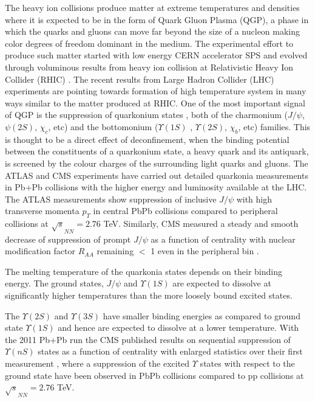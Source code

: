 \documentclass[aps,prc,preprint,superscriptaddress,showpacs,showkeys]{revtex4-1}
\begin{document}
   The heavy ion collisions produce matter at extreme temperatures and densities where 
it is expected to be in the form of Quark Gluon Plasma 
(QGP), a phase in which the quarks and gluons can move far beyond  the size of a nucleon 
making color degrees of freedom dominant in the medium. 
  The experimental effort to produce such matter started with low energy CERN accelerator 
SPS and evolved through voluminous results 
from heavy ion collision at Relativistic Heavy Ion Collider (RHIC) \cite{INTRO}.
The recent results from Large Hadron Collider (LHC) experiments \cite{QGP_Tc} are 
pointing towards formation of high temperature system in many ways similar to the matter
produced at RHIC. 
  One of the most important signal of QGP is the suppression of 
quarkonium states \cite{SATZ}, both of the charmonium ($J/\psi$, $\psi(2S)$, $\chi_{c}$, etc) 
and the bottomonium ($\Upsilon(1S)$ , $\Upsilon(2S)$, $\chi_{b}$, etc) families. This is thought to be a 
direct effect of deconfinement, when the binding potential between the constituents of a quarkonium state, 
a heavy quark and its antiquark, is screened by the colour charges of the surrounding light quarks and gluons. 
 The ATLAS and CMS experiments have carried out detailed quarkonia measurements in Pb+Pb collisions 
with the higher energy and luminosity available at the LHC.
 The ATLAS measurements \cite{ATLAS} show suppression of inclusive $J/\psi$ with high transverse momenta $p_T$  
in central PbPb collisions compared to peripheral collisions at $\sqrt s_{NN} = 2.76$ TeV. 
  Similarly, CMS measured a steady and smooth decrease of suppression 
of prompt $J/\psi$ as a function of centrality with nuclear modification factor $R_{AA}$ remaining $<$ 1 even 
in the peripheral bin \cite{JCMS}. 
 
 The melting temperature of the quarkonia states depends on their binding energy. The ground states, 
$J/\psi$ and $\Upsilon(1S)$ are expected to dissolve at significantly higher temperatures than the 
more loosely bound excited states. 
 
  The $\Upsilon(2S)$ and $\Upsilon(3S)$ have smaller binding energies as compared to ground
state $\Upsilon(1S)$ and hence are expected to dissolve at a lower temperature. 
 With the 2011 Pb+Pb run the CMS published results on sequential suppression of 
$\Upsilon(nS)$ states as a function of centrality \cite{CMSU2} with enlarged statistics
over their first measurement \cite{UCMS}, where a suppression of the excited $\Upsilon$ states with respect to the ground state have been observed  
in PbPb collisions compared to pp collisions at $\sqrt s_{NN} = 2.76$ TeV.\cite{YSuppAbdShuk}
\end{document}
